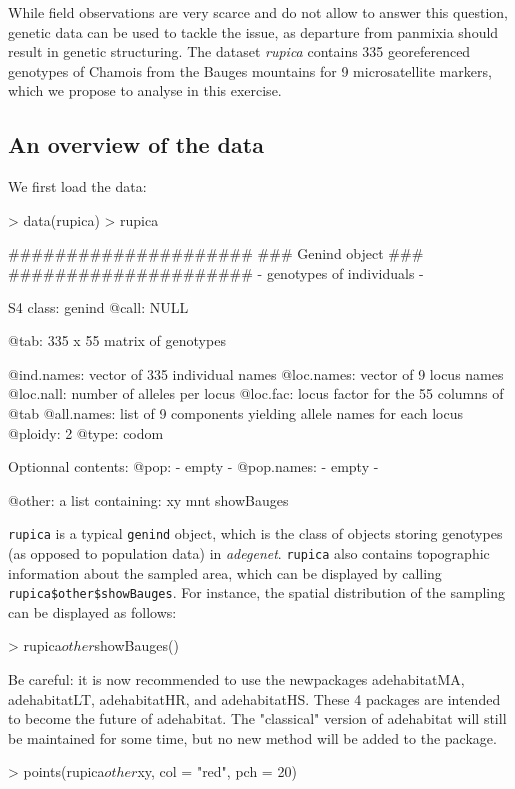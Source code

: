 \documentclass{article}
\begin{document}
While field observations are very scarce and do not allow to answer
this question, genetic data can be used to tackle the issue, as
departure from panmixia should result in genetic structuring.
The dataset \textit{rupica} contains 335 georeferenced genotypes of Chamois from the
Bauges mountains for 9 microsatellite markers, which we propose to
analyse in this exercise.



\subsection{An overview of the data}
We first load the data:
\begin{Schunk}
\begin{Sinput}
> data(rupica)
> rupica
\end{Sinput}
\begin{Soutput}
   #####################
   ### Genind object ### 
   #####################
- genotypes of individuals - 

S4 class:  genind
@call: NULL

@tab:  335 x 55 matrix of genotypes

@ind.names: vector of  335 individual names
@loc.names: vector of  9 locus names
@loc.nall: number of alleles per locus
@loc.fac: locus factor for the  55 columns of @tab
@all.names: list of  9 components yielding allele names for each locus
@ploidy:  2
@type:  codom

Optionnal contents: 
@pop:  - empty -
@pop.names:  - empty -

@other: a list containing: xy  mnt  showBauges 
\end{Soutput}
\end{Schunk}
\texttt{rupica} is a typical \texttt{genind} object, which is the class
of objects storing genotypes (as opposed to population data) in \textit{adegenet}.
\texttt{rupica} also contains topographic information about the
sampled area, which can be displayed by calling
\texttt{rupica\$other\$showBauges}.
For instance, the spatial distribution of the sampling can be
displayed as follows:
\begin{Schunk}
\begin{Sinput}
> rupica$other$showBauges()
\end{Sinput}
\begin{Soutput}
Be careful: it is now recommended to use the newpackages adehabitatMA, adehabitatLT, adehabitatHR, and adehabitatHS.
These 4 packages are intended to become the future of adehabitat.
The "classical" version of adehabitat will still be maintained for some
time, but no new method will be added to the package.
\end{Soutput}
\begin{Sinput}
> points(rupica$other$xy, col = "red", pch = 20)
\end{Sinput}
\end{Schunk}
\end{document}
